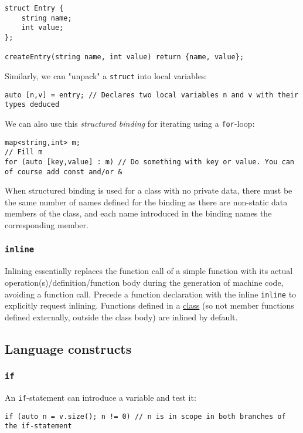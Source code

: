 \documentclass[8pt, table, xcdraw]{article}%
\begin{document}
\begin{lstlisting}
struct Entry {
    string name;
    int value;
};

createEntry(string name, int value) return {name, value}; 
\end{lstlisting}

Similarly, we can "unpack" a \lstinline{struct} into local variables:

\begin{lstlisting}
auto [n,v] = entry; // Declares two local variables n and v with their types deduced
\end{lstlisting}

We can also use this \textit{structured binding} for iterating using a \lstinline{for}-loop:

\begin{lstlisting}
map<string,int> m;
// Fill m
for (auto [key,value] : m) // Do something with key or value. You can of course add const and/or &
\end{lstlisting}

When structured binding is used for a class with no private data, there must be the same number of names defined for the binding as there are non-static data members of the class, and each name introduced in the binding names the corresponding member.

\subsubsection{\lstinline{inline}}
Inlining essentially replaces the function call of a simple function with its actual operation(s)/definition/function body during the generation of machine code, avoiding a function call. Precede a function declaration with the inline \lstinline{inline} to explicitly request inlining. Functions defined in a \hyperref[class]{class} (so not member functions defined externally, outside the class body) are inlined by default.

\subsection{Language constructs}

\subsubsection{\lstinline{if}}
An \lstinline{if}-statement can introduce a variable and test it:

\begin{lstlisting}
if (auto n = v.size(); n != 0) // n is in scope in both branches of the if-statement
\end{lstlisting}
\end{document}
